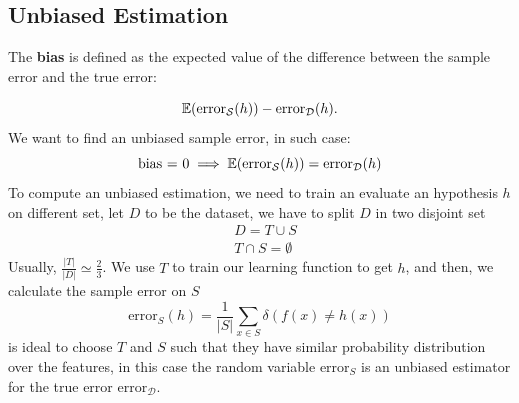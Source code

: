\documentclass[10pt, letterpaper]{report}
\begin{document}
\subsection{Unbiased Estimation}
\begin{definition}
	The \textbf{bias} is defined as the expected value of the difference between the sample error and the true error:
\end{definition}
\begin{equation}
	{\mathbb E}(\text{error}_{\mathcal S}(h))-\text{error}_{\mathcal D}(h).
\end{equation}
We want to find an unbiased sample error, in such case:\begin{equation}
	\text{bias = 0} \implies {\mathbb E}(\text{error}_{\mathcal S}(h))=\text{error}_{\mathcal D}(h)
\end{equation}
To compute an unbiased estimation, we need to train an evaluate an hypothesis $h$ on different set, let $D$ to be the dataset, we have to split $D$ in two disjoint set\begin{align}
	 & D=T\cup S           \\
	 & T\cap S = \emptyset
\end{align}
Usually, $\frac{|T|}{|D|}\simeq \frac{2}{3}$.
We use $T$ to train our learning function to get $h$, and then, we calculate the sample error on $S$\begin{equation}
	\text{error}_{ S}(h)=
	\frac{1}{| S|}\sum_{x\in S}\delta(f(x)\ne h(x))
\end{equation}
is ideal to choose $T$ and $S$ such that they have similar probability distribution over the features, in this case the random variable $\text{error}_{ S}$ is an unbiased estimator for the true error $\text{error}_{ \mathcal D}$.
\end{document}
